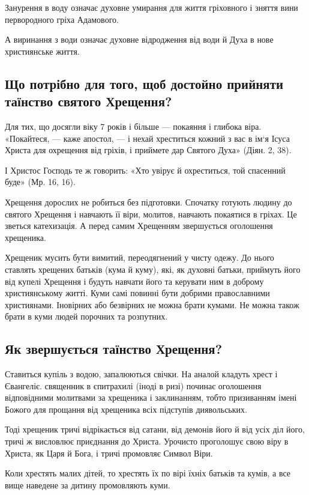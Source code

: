\documentclass[main.tex]{subfiles}
\begin{document}
Занурення в воду означає духовне умирання для життя гріховного і зняття вини первородного гріха Адамового.

А виринання з води означає духовне відродження від води й Духа в нове християнське життя.

\subsection{Що потрібно для того, щоб достойно прийняти таїнство святого Хрещення?}

Для тих, що досягли віку 7 років і більше — покаяння і глибока віра. «Покайтеся, — каже апостол, — і нехай хреститься кожний з вас в ім`я Ісуса Христа для охрещення від гріхів, і приймете дар Святого Духа» (Діян. 2, 38).

І Христос Господь те ж говорить: «Хто увірує й охреститься, той спасенний буде» (Мр. 16, 16).

Хрещення дорослих не робиться без підготовки. Спочатку готують людину до святого Хрещення і навчають її віри, молитов, навчають покаятися в гріхах. Це зветься катехизація. А перед самим Хрещенням звершується оголошення хрещеника.

Хрещеник мусить бути вимитий, переодягнений у чисту одежу. До нього ставлять хрещених батьків (кума й куму), які, як духовні батьки, приймуть його від купелі Хрещення і будуть навчати його та керувати ним в доброму християнському житті. Куми самі повинні бути добрими православними християнами. Іновірних або безвірних не можна брати кумами. Не можна також брати в куми людей порочних та розпутних.

\subsection{Як звершується таїнство Хрещення?}

Ставиться купіль з водою, запалюються свічки. На аналой кладуть хрест і Євангеліє. священник в єпитрахилі (іноді в ризі) починає оголошення відповідними молитвами за хрещеника і заклинанням, тобто призиванням імені Божого для прощання від хрещеника всіх підступів диявольських.

Тоді хрещеник тричі відрікається від сатани, від демонів його й від усіх діл його, тричі ж висловлює приєднання до Христа. Урочисто проголошує свою віру в Христа, як Царя й Бога, і тричі промовляє Символ Віри.

Коли хрестять малих дітей, то хрестять їх по вірі їхніх батьків та кумів, а все вище наведене за дитину промовляють куми.
\end{document}
